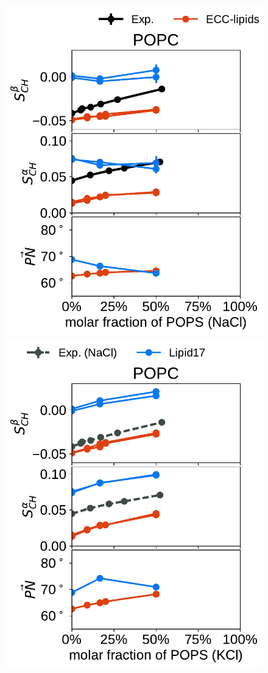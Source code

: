\documentclass[journal=jpcbfk,manuscript=article]{achemso}
\newlength{\figheightsmall}
\newlength{\figheight}
\begin{document}
\begin{figure}[!tbp]
  \includegraphics[height=\figheightsmall]{../img/ecc_pops/order_parameters_changes_A-B_PC-PS_mix_POPC_nacl.pdf} 
  \includegraphics[height=\figheightsmall]{../img/ecc_pops/order_parameters_changes_A-B_PC-PS_mix_POPC_kcl.pdf} 

\end{figure}
\end{document}
